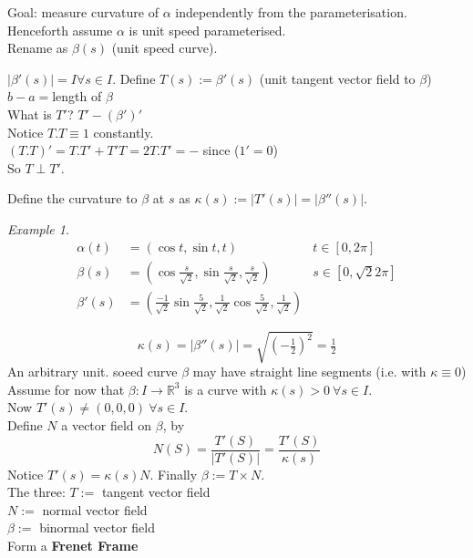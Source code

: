 \documentclass{article}
\newcommand{\R}{\mathbb{R}}
\theoremstyle{definition}
\theoremstyle{remark}
\theoremstyle{example}
\newtheorem*{example}{Example}
\begin{document}
	Goal: measure curvature of $\alpha$ independently from the parameterisation.\\
	Henceforth assume $\alpha$ is unit speed parameterised.\\
	Rename as $\beta(s)$ (unit speed curve).
	
	$|\beta'(s)|=I \forall s \in I$.
	Define $T(s):=\beta'(s)$ (unit tangent vector field to $\beta$)\\
	$b-a=$length of $\beta$\\
	What is $T'$? $T'-(\beta')'$\\
	Notice $T.T\equiv 1$ constantly.\\
	$(T.T)'=T.T'+T'T=2T.T'
	=-$ since ($1'=0$)\\
	So $T \perp T'$.
	
	Define the curvature to $\beta$ at $s$ as $\kappa(s):=|T'(s)|=|\beta''(s)|$.
	
	\begin{example}
		\begin{align*}
			\alpha(t)&=(\cos t, \sin t, t) & t \in [0,2 \pi]\\
			\beta(s) &=\left(\cos \frac{s}{\sqrt{2}},\sin \frac{s}{\sqrt{2}}, \frac{s}{\sqrt{2}} \right) & s \in [0,\sqrt{2} 2 \pi]\\
			\beta'(s) & = \left( \frac{-1}{\sqrt{2}} \sin \frac{5}{\sqrt{2}},\frac{1}{\sqrt{2}} \cos \frac{5}{\sqrt{2}} ,\frac{1}{\sqrt{2}}\right)
		\end{align*}
	\end{example}
	\[ \kappa(s)=|\beta''(s)|=\sqrt{(-\tfrac{1}{2})^2}=\tfrac{1}{2} \]
	An arbitrary unit. soeed curve $\beta$ may have straight line segments (i.e. with $\kappa \equiv 0$)\\
	Assume for now that $\beta:I \to \R^3$ is a curve with $\kappa(s)>0\ \forall s \in I$.\\
	Now $T'(s) \neq (0,0,0)\ \forall s \in I$.\\
	Define $N$ a vector field on $\beta$, by \[N(S)=\frac{T'(S)}{|T'(S)|}=\frac{T'(S)}{\kappa(s)}\]
	Notice $T'(s)=\kappa(s)N$.
	Finally $\beta:= T \times N$.\\
	The three:
	$T:=$ tangent vector field\\
	$N:=$ normal vector field\\
	$\beta :=$ binormal vector field\\
	Form a \textbf{Frenet Frame}
	
	
	\pagebreak
\end{document}
